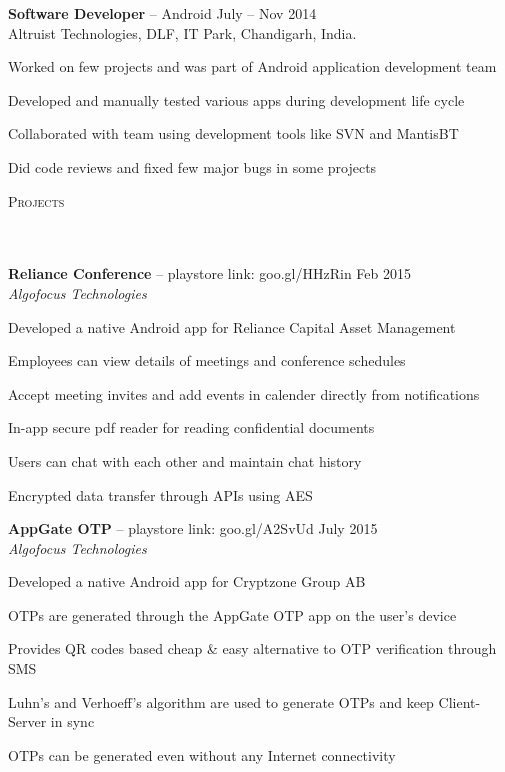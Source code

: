 \documentclass{article}
\newcommand{\header}[1]{{
\hspace*{-15pt}\vspace*{6pt} \textsc{#1}} \vspace*{-6pt} 
\lineunder
}
\newcommand{\lineunder}{
\vspace*{-8pt} \\ \hspace*{-18pt} 
\hrulefill \\
}
\newcommand{\employer}[4]{{
\vspace*{2pt}%
\textbf{#1} #2 \hfill #3\\ #4 \vspace*{2pt}}
}
\newcommand{\project}[4]{{
\vspace*{2pt}%
\textbf{#1} #2 \hfill #3\\ \textit{#4} \vspace*{2pt}}
}
\renewcommand{\labelitemii}{
$\vcenter{\hbox{\tiny$\bullet$}}$\hspace*{-3pt}
}
\newenvironment{bullet-list-minor}{
\begin{list}{\labelitemii}{\setlength\leftmargin{15pt} 
\topsep 0pt \itemsep -2pt}}{\vspace*{4pt}\end{list}
}
\begin{document}
    \employer{Software Developer}{-- Android}{July -- Nov 2014}{Altruist Technologies, DLF, IT Park, Chandigarh, India.}
	\begin{bullet-list-minor}
	\item Worked on few projects and was part of Android application development team
	\item Developed and manually tested various apps during development life cycle
	\item Collaborated with team using development tools like SVN and MantisBT
	\item Did code reviews and fixed few major bugs in some projects
	\end{bullet-list-minor}

\vspace*{4pt}%
\header{Projects}
    \project{Reliance Conference}{-- playstore link: goo.gl/HHzRin}{Feb 2015}{Algofocus Technologies}
	\begin{bullet-list-minor}
	\item Developed a native Android app for Reliance Capital Asset Management
	\item Employees can view details of meetings and conference schedules
	\item Accept meeting invites and add events in calender directly from notifications
	\item In-app secure pdf reader for reading confidential documents
    \item Users can chat with each other and maintain chat history
	\item Encrypted data transfer through APIs using AES
    \end{bullet-list-minor}

    \project{AppGate OTP}{-- playstore link: goo.gl/A2SvUd}{July 2015}{Algofocus Technologies}
	\begin{bullet-list-minor}
	\item Developed a native Android app for Cryptzone Group AB
	\item OTPs are generated through the AppGate OTP app on the user's device
	\item Provides QR codes based cheap \& easy alternative to OTP verification through SMS
    \item Luhn's and Verhoeff's algorithm are used to generate OTPs and keep Client-Server in sync
	\item OTPs can be generated even without any Internet connectivity
    \end{bullet-list-minor}
\end{document}
